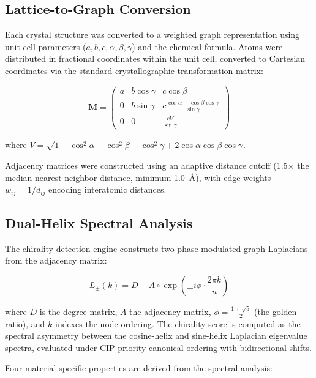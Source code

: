 \documentclass[11pt,a4paper]{article}
\begin{document}
\subsection{Lattice-to-Graph Conversion}

Each crystal structure was converted to a weighted graph representation using unit cell parameters ($a, b, c, \alpha, \beta, \gamma$) and the chemical formula. Atoms were distributed in fractional coordinates within the unit cell, converted to Cartesian coordinates via the standard crystallographic transformation matrix:

\begin{equation}
\mathbf{M} = \begin{pmatrix}
a & b\cos\gamma & c\cos\beta \\
0 & b\sin\gamma & c\frac{\cos\alpha - \cos\beta\cos\gamma}{\sin\gamma} \\
0 & 0 & \frac{cV}{\sin\gamma}
\end{pmatrix}
\end{equation}

where $V = \sqrt{1 - \cos^2\alpha - \cos^2\beta - \cos^2\gamma + 2\cos\alpha\cos\beta\cos\gamma}$.

Adjacency matrices were constructed using an adaptive distance cutoff (1.5$\times$ the median nearest-neighbor distance, minimum 1.0~\AA), with edge weights $w_{ij} = 1/d_{ij}$ encoding interatomic distances.

\subsection{Dual-Helix Spectral Analysis}

The chirality detection engine constructs two phase-modulated graph Laplacians from the adjacency matrix:

\begin{equation}
L_{\pm}(k) = D - A \circ \exp\left(\pm i\phi \cdot \frac{2\pi k}{n}\right)
\end{equation}

where $D$ is the degree matrix, $A$ the adjacency matrix, $\phi = \frac{1+\sqrt{5}}{2}$ (the golden ratio), and $k$ indexes the node ordering. The chirality score is computed as the spectral asymmetry between the cosine-helix and sine-helix Laplacian eigenvalue spectra, evaluated under CIP-priority canonical ordering with bidirectional shifts.

Four material-specific properties are derived from the spectral analysis:
\end{document}
